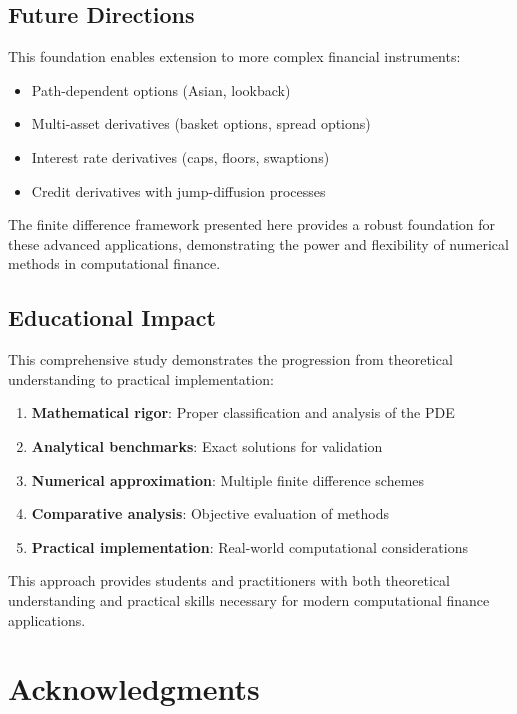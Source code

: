 \documentclass[12pt,a4paper]{article}
\numberwithin{algorithm}{subsection}
\begin{document}
\subsection{Future Directions}

This foundation enables extension to more complex financial instruments:

\begin{itemize}
\item Path-dependent options (Asian, lookback)
\item Multi-asset derivatives (basket options, spread options)
\item Interest rate derivatives (caps, floors, swaptions)
\item Credit derivatives with jump-diffusion processes
\end{itemize}

The finite difference framework presented here provides a robust foundation for these advanced applications, demonstrating the power and flexibility of numerical methods in computational finance.

\subsection{Educational Impact}

This comprehensive study demonstrates the progression from theoretical understanding to practical implementation:

\begin{enumerate}
\item \textbf{Mathematical rigor}: Proper classification and analysis of the PDE
\item \textbf{Analytical benchmarks}: Exact solutions for validation
\item \textbf{Numerical approximation}: Multiple finite difference schemes
\item \textbf{Comparative analysis}: Objective evaluation of methods
\item \textbf{Practical implementation}: Real-world computational considerations
\end{enumerate}

This approach provides students and practitioners with both theoretical understanding and practical skills necessary for modern computational finance applications.

\section*{Acknowledgments}
\end{document}
